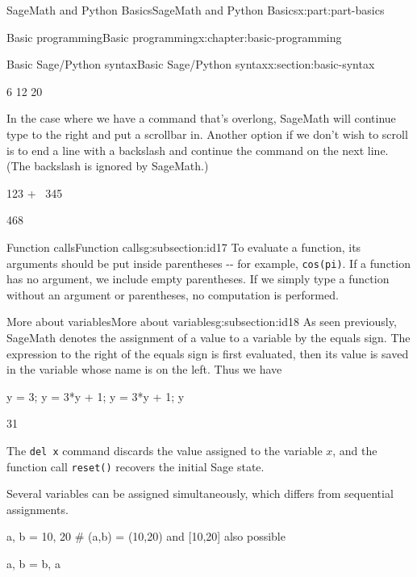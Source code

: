 \documentclass[oneside,10pt,]{book}
\newcommand{\mono}[1]{\texttt{#1}}
\numberwithin{equation}{section}
\begin{document}
\begin{partptx}{SageMath and Python Basics}{}{SageMath and Python Basics}{}{}{x:part:part-basics}
\begin{chapterptx}{Basic programming}{}{Basic programming}{}{}{x:chapter:basic-programming}
\begin{sectionptx}{Basic Sage\slash{}Python syntax}{}{Basic Sage\slash{}Python syntax}{}{}{x:section:basic-syntax}
\begin{sageoutput}
6
12
20
\end{sageoutput}
In the case where we have a command that's overlong, SageMath will continue type to the right and put a scrollbar in. Another option if we don't wish to scroll is to end a line with a backslash and continue the command on the next line. (The backslash is ignored by SageMath.)%
\begin{sageinput}
123 + \
345
\end{sageinput}
\begin{sageoutput}
468
\end{sageoutput}
%
%
\typeout{************************************************}
\typeout{************************************************}
%
\begin{subsectionptx}{Function calls}{}{Function calls}{}{}{g:subsection:id17}
To evaluate a function, its arguments should be put inside parentheses -{}-{} for example, \mono{cos(pi)}. If a function has no argument, we include empty parentheses. If we simply type a function without an argument or parentheses, no computation is performed.%
\end{subsectionptx}
%
%
\typeout{************************************************}
\typeout{************************************************}
%
\begin{subsectionptx}{More about variables}{}{More about variables}{}{}{g:subsection:id18}
As seen previously, SageMath denotes the assignment of a value to a variable by the equals sign. The expression to the right of the equals sign is first evaluated, then its value is saved in the variable whose name is on the left. Thus we have%
\begin{sageinput}
y = 3; y = 3*y + 1; y = 3*y + 1; y
\end{sageinput}
\begin{sageoutput}
31
\end{sageoutput}
The \mono{del x} command discards the value assigned to the variable \(x\), and the function call \mono{reset()} recovers the initial Sage state.%
\par
Several variables can be assigned simultaneously, which differs from sequential assignments.%
\begin{sageinput}
a, b = 10, 20 # (a,b) = (10,20) and [10,20] also possible
\end{sageinput}
\begin{sageinput}
a, b = b, a

\end{sageinput}
\end{subsectionptx}
\end{sectionptx}
\end{chapterptx}
\end{partptx}
\end{document}
